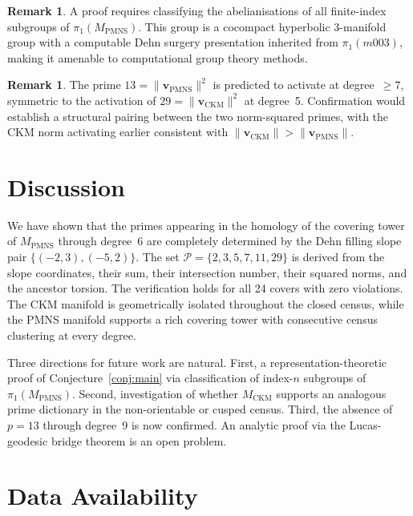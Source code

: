 \documentclass[12pt]{article}
\theoremstyle{definition}
\newtheorem{remark}[theorem]{Remark}
\begin{document}
\begin{remark}
A proof requires classifying the abelianisations of all finite-index
subgroups of $\pi_1(M_{\mathrm{PMNS}})$. This group is a cocompact
hyperbolic 3-manifold group with a computable Dehn surgery presentation
inherited from $\pi_1(m003)$, making it amenable to computational
group theory methods.
\end{remark}

\begin{remark}
The prime $13 = \|\mathbf{v}_{\mathrm{PMNS}}\|^2$ is predicted to
activate at degree~$\geq 7$, symmetric to the activation of
$29 = \|\mathbf{v}_{\mathrm{CKM}}\|^2$ at degree~5. Confirmation would
establish a structural pairing between the two norm-squared primes,
with the CKM norm activating earlier consistent with
$\|\mathbf{v}_{\mathrm{CKM}}\| > \|\mathbf{v}_{\mathrm{PMNS}}\|$.
\end{remark}

\section{Discussion}
\label{sec:conclusion}

We have shown that the primes appearing in the homology of the covering
tower of $M_{\mathrm{PMNS}}$ through degree~6 are completely determined
by the Dehn filling slope pair $\{(-2,3),(-5,2)\}$. The set
$\mathcal{P} = \{2,3,5,7,11,29\}$ is derived from the slope
coordinates, their sum, their intersection number, their squared norms,
and the ancestor torsion. The verification holds for all 24 covers with
zero violations. The CKM manifold is geometrically isolated throughout
the closed census, while the PMNS manifold supports a rich covering
tower with consecutive census clustering at every degree.

Three directions for future work are natural. First, a
representation-theoretic proof of Conjecture~\ref{conj:main} via
classification of index-$n$ subgroups of $\pi_1(M_{\mathrm{PMNS}})$.
Second, investigation of whether $M_{\mathrm{CKM}}$ supports an
analogous prime dictionary in the non-orientable or cusped census.
Third, the absence of $p=13$ through degree~9 is now confirmed.
An analytic proof via the Lucas-geodesic bridge theorem is an open problem.

\section*{Data Availability}
\end{document}
